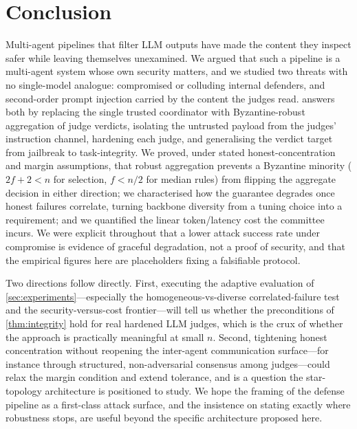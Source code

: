\section{Conclusion}
\label{sec:conclusion}

Multi-agent pipelines that filter LLM outputs have made the content they inspect safer
while leaving themselves unexamined. We argued that such a pipeline is a multi-agent system
whose own security matters, and we studied two threats with no single-model analogue:
compromised or colluding internal defenders, and second-order prompt injection carried by
the content the judges read. \Aegis answers both by replacing the single trusted
coordinator with Byzantine-robust aggregation of judge verdicts, isolating the untrusted
payload from the judges' instruction channel, hardening each judge, and generalising the
verdict target from jailbreak to task-integrity. We proved, under stated
honest-concentration and margin assumptions, that robust aggregation prevents a Byzantine
minority ($2f{+}2<n$ for selection, $f<n/2$ for median rules) from flipping the aggregate
decision in either direction; we characterised how the guarantee degrades once honest
failures correlate, turning backbone diversity from a tuning choice into a requirement; and
we quantified the linear token/latency cost the committee incurs. We were explicit
throughout that a lower attack success rate under compromise is evidence of graceful
degradation, not a proof of security, and that the empirical figures here are placeholders
fixing a falsifiable protocol.

Two directions follow directly. First, executing the adaptive evaluation of
\cref{sec:experiments}—especially the homogeneous-vs-diverse correlated-failure test and the
security-versus-cost frontier—will tell us whether the preconditions of \cref{thm:integrity}
hold for real hardened LLM judges, which is the crux of whether the approach is practically
meaningful at small $n$. Second, tightening honest concentration without reopening the
inter-agent communication surface—for instance through structured, non-adversarial
consensus among judges—could relax the margin condition and extend tolerance, and is a
question the star-topology architecture is positioned to study. We hope the framing of the
defense pipeline as a first-class attack surface, and the insistence on stating exactly
where robustness stops, are useful beyond the specific architecture proposed here.
